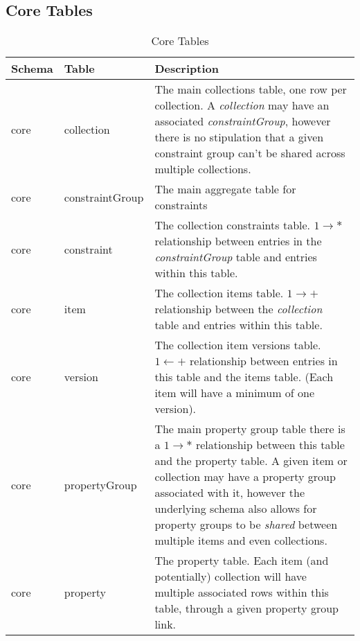 \documentclass{book}
\begin{document}
\subsection{Core Tables}
\begin{table}[H]
    \centering
    \begin{tabular}{|| p{0.1\linewidth} | p{0.2\linewidth} | p{0.7\linewidth} ||}
        \hline
        \textbf{Schema} & \textbf{Table} & \textbf{Description}\\
        \hline
        core & collection & The main collections table, one row per collection. A \textit{collection} may have an associated \textit{constraintGroup}, however there is no stipulation that a given constraint group can't be shared across multiple collections.  \\
        \hline
        core & constraintGroup & The main aggregate table for constraints \\
        \hline
        core & constraint & The collection constraints table. $1 \rightarrow *$ relationship between entries in the \textit{constraintGroup} table and entries within this table. \\
        \hline
        core & item & The collection items table.  $1 \rightarrow +$ relationship between the \textit{collection} table and entries within this table.\\
        \hline
        core & version & The collection item versions table. $1 \leftarrow +$ relationship between entries in this table and the items table.  (Each item will have a minimum of one version).\\
        \hline
        core & propertyGroup & The main property group table there is a $1 \rightarrow *$ relationship between this table and the property table. A given item or collection may have a property group associated with it, however the underlying schema also allows for property groups to be \textit{shared} between multiple items and even collections.\\
        \hline
        core & property & The property table. Each item (and potentially) collection will have multiple associated rows within this table, through a given property group link. \\
        \hline 
    \end{tabular}
    \caption{Core Tables}
    \label{table_core_tables}
\end{table}
\end{document}
